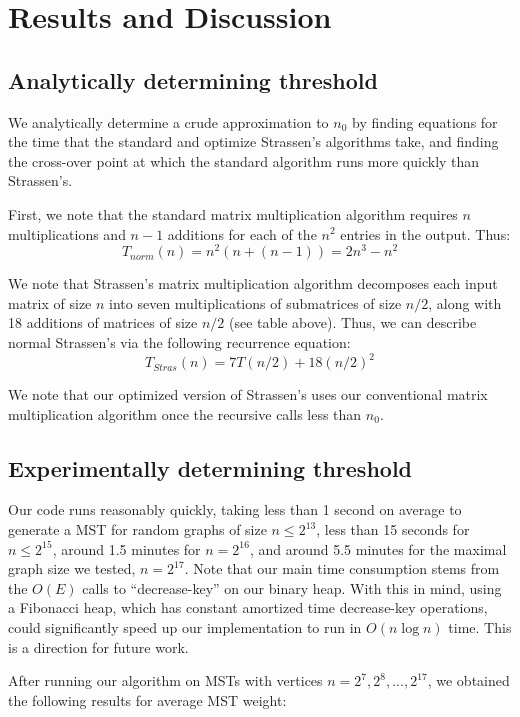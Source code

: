 \documentclass[a4paper]{article}
\begin{document}
\section{Results and Discussion}

\subsection{Analytically determining threshold}
We analytically determine a crude approximation to $n_0$ by finding equations for the time that the standard and optimize Strassen's algorithms take, and finding the cross-over point at which the standard algorithm runs more quickly than Strassen's.

First, we note that the standard matrix multiplication algorithm requires $n$ multiplications and $n-1$ additions for each of the $n^2$ entries in the output. Thus:
$$T_{norm}(n) = n^2(n + (n-1)) = 2n^3 - n^2$$

We note that Strassen's matrix multiplication algorithm decomposes each input matrix of size $n$ into seven multiplications of submatrices of size $n/2$, along with 18 additions of matrices of size $n/2$ (see table above). Thus, we can describe normal Strassen's via the following recurrence equation: 
$$T_{Stras}(n) = 7T(n/2) + 18(n/2)^2$$

We note that our optimized version of Strassen's uses our conventional matrix multiplication algorithm once the recursive calls  less than $n_0$.

\subsection{Experimentally determining threshold}



Our code runs reasonably quickly, taking less than 1 second on average to generate a MST for random graphs of size $n\leq2^{13}$, less than 15 seconds for $n\leq 2^{15}$, around 1.5 minutes for $n=2^{16}$, and around 5.5 minutes for the maximal graph size we tested, $n=2^{17}$. Note that our main time consumption stems from the $O(E)$ calls to ``decrease-key'' on our binary heap. With this in mind, using a Fibonacci heap, which has constant amortized time decrease-key operations, could significantly speed up our implementation to run in $O(n\log n)$ time. This is a direction for future work.

\newpage
After running our algorithm on MSTs with vertices $n=2^7, 2^8, ..., 2^{17}$, we obtained the following results for average MST weight:
\end{document}
